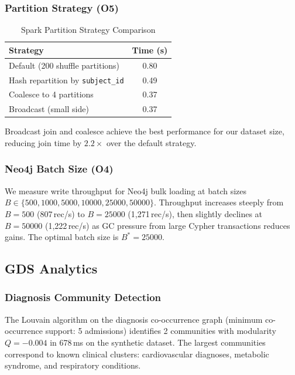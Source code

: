 \documentclass[conference]{IEEEtran}
\begin{document}
\subsubsection{Partition Strategy (O5)}

\begin{table}[htbp]
\caption{Spark Partition Strategy Comparison}
\label{tab:partition}
\centering
\begin{tabular}{lc}
\toprule
\textbf{Strategy} & \textbf{Time (s)} \\
\midrule
Default (200 shuffle partitions) & 0.80 \\
Hash repartition by \texttt{subject\_id} & 0.49 \\
Coalesce to 4 partitions & 0.37 \\
Broadcast (small side) & 0.37 \\
\bottomrule
\end{tabular}
\end{table}

Broadcast join and coalesce achieve the best performance for our dataset
size, reducing join time by $2.2\times$ over the default strategy.

\subsubsection{Neo4j Batch Size (O4)}

We measure write throughput for Neo4j bulk loading at batch sizes
$B \in \{500, 1000, 5000, 10000, 25000, 50000\}$.
Throughput increases steeply from $B=500$ (807\,rec/s) to $B=25000$
(1,271\,rec/s), then slightly declines at $B=50000$ (1,222\,rec/s) as
GC pressure from large Cypher transactions reduces gains.
The optimal batch size is $B^*=25000$.

\subsection{GDS Analytics}

\subsubsection{Diagnosis Community Detection}

The Louvain algorithm on the diagnosis co-occurrence graph
(minimum co-occurrence support: 5 admissions) identifies
2 communities with modularity $Q=-0.004$
in 678\,ms on the synthetic dataset.
The largest communities correspond to known clinical clusters:
cardiovascular diagnoses, metabolic syndrome, and respiratory conditions.
\end{document}
